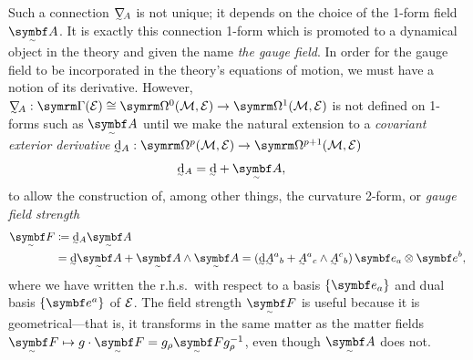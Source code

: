 Such a connection $\ts\nabla_{\!A}$ is not unique; it depends on the choice of the 1-form field $\tsbm A$.
It is exactly this connection 1-form which is promoted to a dynamical object in the theory and given the name \emph{the gauge field}.
In order for the gauge field to be incorporated in the theory's equations of motion, we must have a notion of its derivative.
However, $\ts\nabla_{\!A} : \secs(\cal E) \cong \forms^0(\cal M, \cal E) \to \forms^1(\cal M, \cal E)$ is not defined on 1-forms such as $\tsbm A$ until we make the natural extension\footnotemark{} to a \emph{covariant exterior derivative}
$\ts\dd_A : \forms^p(\cal M, \cal E) \to \forms^{p + 1}(\cal M, \cal E)$
\begin{align}
	\ts\dd_A &= \ts\dd + \tsbm A
,\end{align}
%
to allow the construction of, among other things, the curvature 2-form, or \emph{gauge field strength}
\begin{align}
	\tsbm F &\coloneq \ts\dd_A\tsbm A
\\	&= \ts\dd\tsbm A + \tsbm A \wedge \tsbm A
	= (\ts\dd\ts A^a{}_b + \ts A^a{}_c \wedge \ts A^c{}_b) \, \bm e_a \otimes \bm e^b
,\end{align}
where we have written the r.h.s.\ with respect to a basis $\qty{\bm e_a}$ and dual basis $\qty{\bm e^a}$ of $\cal E$.
The field strength $\tsbm F$ is useful because it is geometrical---that is, it transforms in the same matter as the matter fields $\tsbm F \mapsto g\cdot\tsbm F = g_\rho\tsbm F g_\rho^{-1}$, even though $\tsbm A$ does not.

